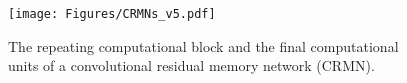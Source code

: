 \documentclass{article}
\begin{document}
\begin{figure}[htbp]
  \centering
    \texttt{[image: Figures/CRMNs\_v5.pdf]}
  \caption[The CRMN architecture]{The repeating computational block and the final computational units of a convolutional residual memory network (CRMN).}
  \label{fig:monorail}
\end{figure}


\end{document}
